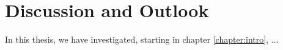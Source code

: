 \chapter{Discussion and Outlook}
\label{chapter:disc}

In this thesis, we have investigated, starting in chapter \ref{chapter:intro}, ...